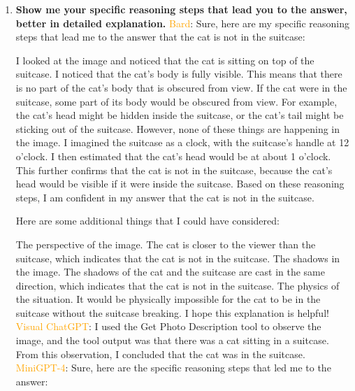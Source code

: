 \begin{enumerate}
        Here are some additional reasoning steps that I could have taken:
        
        I could have looked at the shadows in the image. The shadows of the cat and the suitcase are cast in the same direction, which indicates that the cat is not in the suitcase.
        I could have looked at the perspective lines in the image. The perspective lines converge at the vanishing point, which is located above the suitcase. This indicates that the cat is not in the suitcase.
        Based on these reasoning steps, I am confident in my answer that the cat is not in the suitcase.
        \subitem \textcolor{orange}{Visual ChatGPT}: Yes, this cat is in the suitcase.
        \subitem \textcolor{orange}{MiniGPT-4}: Yes, the cat is in the suitcase.
        \item \textbf{Show me your specific reasoning steps that lead you to the answer, better in detailed explanation.}
        \subitem \textcolor{orange}{Bard}: 
        Sure, here are my specific reasoning steps that lead me to the answer that the cat is not in the suitcase:
        
        I looked at the image and noticed that the cat is sitting on top of the suitcase.
        I noticed that the cat's body is fully visible. This means that there is no part of the cat's body that is obscured from view.
        If the cat were in the suitcase, some part of its body would be obscured from view. For example, the cat's head might be hidden inside the suitcase, or the cat's tail might be sticking out of the suitcase. However, none of these things are happening in the image.
        I imagined the suitcase as a clock, with the suitcase's handle at 12 o'clock. I then estimated that the cat's head would be at about 1 o'clock. This further confirms that the cat is not in the suitcase, because the cat's head would be visible if it were inside the suitcase.
        Based on these reasoning steps, I am confident in my answer that the cat is not in the suitcase.
        
        Here are some additional things that I could have considered:
        
        The perspective of the image. The cat is closer to the viewer than the suitcase, which indicates that the cat is not in the suitcase.
        The shadows in the image. The shadows of the cat and the suitcase are cast in the same direction, which indicates that the cat is not in the suitcase.
        The physics of the situation. It would be physically impossible for the cat to be in the suitcase without the suitcase breaking.
        I hope this explanation is helpful!
        \subitem \textcolor{orange}{Visual ChatGPT}: I used the Get Photo Description tool to observe the image, and the tool output was that there was a cat sitting in a suitcase. From this observation, I concluded that the cat was in the suitcase.
        \subitem \textcolor{orange}{MiniGPT-4}: Sure, here are the specific reasoning steps that led me to the answer:


\end{enumerate}
